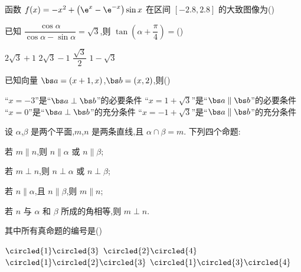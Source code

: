 \begin{problem}
函数 \( f(x)=-x^2+\left( \e^x-\e^{-x} \right)\sin x \) 在区间 \( [-2.8,2.8] \) 的大致图像为(\quad)

\choices
    {}
    {}
    {}
    {}
\end{problem}

\begin{problem}
已知 \( \dfrac{\cos \alpha}{\cos \alpha-\sin \alpha}=\sqrt{3} \),则 \( \tan \left( \alpha+\dfrac{\pi}{4} \right)= \)(\quad)

\choices
    {\( 2\sqrt{3}+1 \)}
    {\( 2\sqrt{3}-1 \)}
    {\( \dfrac{\sqrt{3}}{2} \)}
    {\( 1-\sqrt{3} \)}
\end{problem}

\begin{problem}
已知向量 \( \bs a=(x+1,x) \),\( \bs b=(x,2) \),则(\quad)

\choices
    {``\( x=-3 \)''是``\( \bs a\perp \bs b \)''的必要条件}
    {``\( x=1+\sqrt{3} \)''是``\( \bs a\parallel\bs b \)''的必要条件}
    {``\( x=0 \)''是``\( \bs a\perp \bs b \)''的充分条件}
    {``\( x=-1+\sqrt{3} \)''是``\( \bs a\parallel\bs b \)''的充分条件}
\end{problem}

\begin{problem}
设 \(\alpha\),\(\beta\) 是两个平面,\(m\),\(n\) 是两条直线,且 \( \alpha\cap\beta=m \). 下列四个命题:

\begin{circlelist}
\item 若 \( m\parallel n \),则 \( n\parallel\alpha \) 或 \( n\parallel\beta \);
\item 若 \( m\perp n \),则 \( n\perp \alpha \) 或 \( n\perp \beta \);
\item 若 \( n\parallel\alpha \),且 \( n\parallel\beta \),则 \( m\parallel n \);
\item 若 \( n \) 与 \( \alpha \) 和 \( \beta \) 所成的角相等,则 \( m\perp n \).
\end{circlelist}

其中所有真命题的编号是(\quad)

\choices
    {\( \circled{1}\circled{3} \)}
    {\( \circled{2}\circled{4} \)}
    {\( \circled{1}\circled{2}\circled{3} \)}
    {\( \circled{1}\circled{3}\circled{4} \)}
\end{problem}

